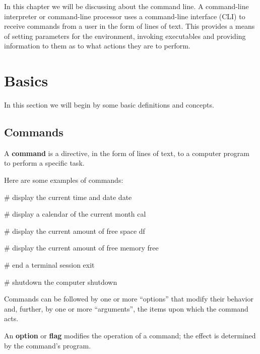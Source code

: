 
In this chapter we will be discussing about the command line. A command-line interpreter or command-line processor
uses a command-line interface (CLI) to receive commands from a user in the form of lines of text. This provides a
means of setting parameters for the environment, invoking executables and providing information to them as to what
actions they are to perform.

\section{Basics}

In this section we will begin by some basic definitions and concepts.

\subsection{Commands}

\bd[Command]
A \textbf{command} is a directive, in the form of lines of text, to a computer program to perform a specific task.
\ed

\be
Here are some examples of commands:
\begin{bash}
# display the current time and date
date
\end{bash}

\begin{bash}
# display a calendar of the current month
cal
\end{bash}

\begin{bash}
# display the current amount of free space
df
\end{bash}

\begin{bash}
# display the current amount of free memory
free
\end{bash}

\begin{bash}
# end a terminal session
exit
\end{bash}

\begin{bash}
# shutdown the computer
shutdown
\end{bash}
\ee

Commands can be followed by one or more ``options'' that modify their behavior and, further, by one or more
``arguments'', the items upon which the command acts.

An \textbf{option} or \textbf{flag} modifies the operation of a command; the effect is determined by the command's
program.
\ed

